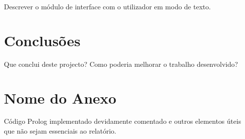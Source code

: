 \documentclass[a4paper]{article}
\begin{document}
Descrever o módulo de interface com o utilizador em modo de texto.


\section{Conclusões}
Que conclui deste projecto? Como poderia melhorar o trabalho desenvolvido?


\clearpage
{}
\renewcommand\refname{Bibliografia}



\newpage
\appendix
\section{Nome do Anexo}
Código Prolog implementado devidamente comentado e outros elementos úteis que não sejam essenciais ao relatório.
\end{document}
